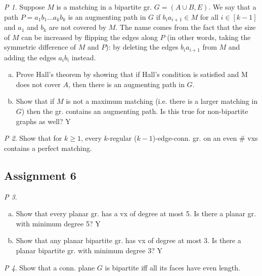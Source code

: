 \documentclass[11pt, fleqn, a4paper, landscape]{article}
\theoremstyle{plain} %
\theoremstyle{remark} %
\newtheorem{problem}{P}
\theoremstyle{definition} %
\begin{document}
\begin{multicols}{5}
\begin{problem}
Suppose $M$ is a matching in a bipartite gr. $G = (A\cup B,E)$. We say that a path $P = a_1b_1\dots a_kb_k$ is an augmenting path in $G$ if $b_ia_{i+1}\in M$ for all $i\in [k - 1]$ and $a_1$ and $b_k$ are not covered by $M$. The name comes from the fact that the size of $M$ can be increased
by 
flipping the edges along $P$ (in other words, taking the symmetric difference of $M$ and $P$): by deleting the edges $b_ia_{i+1}$ from $M$ and adding the edges $a_ib_i$ instead.
\begin{enumerate}[(a)]
\item Prove Hall's theorem by showing that if Hall's condition is satisfied and M does not cover $A$, then there is an augmenting path in $G$.
\item Show that if $M$ is not a maximum matching (i.e. there is a larger matching in $G$) then the gr. contains an augmenting path. Is this true for non-bipartite graphs as well? Y
\end{enumerate}
\end{problem}

\begin{problem}
Show that for $k\ge 1$, every $k$-regular ($k- 1$)-edge-conn. gr. on an even \# vxs contains a perfect matching.
\end{problem}

\subsection{Assignment 6}

\addtocounter{problem}{1}

\begin{problem}
\begin{enumerate}[(a)]
\item Show that every planar gr. has a vx of degree at most 5. Is there a planar gr. with minimum degree 5? Y
\item Show that any planar bipartite gr. has vx of degree at most 3. Is there a planar bipartite gr. with minimum degree 3? Y
\end{enumerate}
\end{problem}

\begin{problem}
Show that a conn. plane $G$ is bipartite iff all its faces have even length.
\end{problem}


\end{multicols}
\end{document}
